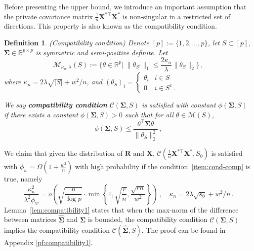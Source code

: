 \documentclass[11pt]{article}
\newtheorem{definition}{Definition}%
\renewcommand{\hat}{\widehat}
\newcommand{\bX}{\boldsymbol{X}}
\newcommand{\bR}{\boldsymbol{R}}
\newcommand{\bSigma}{\boldsymbol{\Sigma}}
\begin{document}
Before presenting the upper bound, we introduce an important assumption that the private covariance matrix $\frac{1}{n}\bX^{*\top}\bX^*$ is non-singular in a restricted set of directions. This property is also known as the compatibility condition.
\begin{definition}
    (Compatibility condition) Denote $[p]:=\{1,2,\dotsc,p\}$, let $S\subset [p]$, $\bSigma\in\mathbb{R}^{p\times p}$ is symmetric and semi-positive definite. Let
    \begin{equation}\label{def:restricted-set}
        \mathcal{M}_{\kappa_n,\lambda}(S):= \bigg\{\theta\in\mathbb{R}^p\bigg|\; \|\theta_{S^c}\|_1\leq \frac{2\kappa_n}{\lambda}\|\theta_S\|_2\bigg\}\,,
    \end{equation}
    where $\kappa_n = 2\lambda\sqrt{|S|}+w^2/n$, and $(\theta_S)_i =\begin{cases}
        \theta_i & i\in S\\
        0 & i\in S^c\,.
    \end{cases}$
    
    We say \textbf{compatibility condition }$\mathcal{C}(\bSigma,S)$ is satisfied with constant $\phi(\bSigma,S)$ if there exists a constant $\phi(\bSigma,S)>0$ such that for all $\theta \in \mathcal{M}(S)$,
    \[
    \phi(\bSigma,S)\leq\frac{\theta^\top \bSigma \theta}{\|\theta_S\|_2^2}\,,
    \]
\end{definition}
We claim that given the distribution of $\bR$ and $\bX$, $\mathcal{C}\left(\frac{1}{n}\bX^{*\top}\bX^*,S_0\right)$ is satisfied with $\phi_w = \Omega(1+\frac{w^2}{n})$ with high probability if the condition~\ref{item:cond-comp} is true, namely
\[
\frac{\kappa_n^2}{\lambda^2\phi_w}=o\left(\sqrt{\frac{n}{\log p}}\cdot\min\left\{1,\sqrt{\frac{r}{n}},\frac{\sqrt{rn}}{w^2}\right\}\right)\,,\quad \kappa_n = 2\lambda\sqrt{s_0}+w^2/n\,.
\] 
Lemma~\ref{lem:compatibility1} states that when the max-norm of the difference between matrices $\hat{\bSigma}$ and $\bSigma$ is bounded, the compatibility condition $\mathcal{C}(\bSigma,S)$ implies the compatibility condition $\mathcal{C}\left(\hat{\bSigma},S\right)$. The proof can be found in Appendix \ref{pf:compatibility1}.
\end{document}
